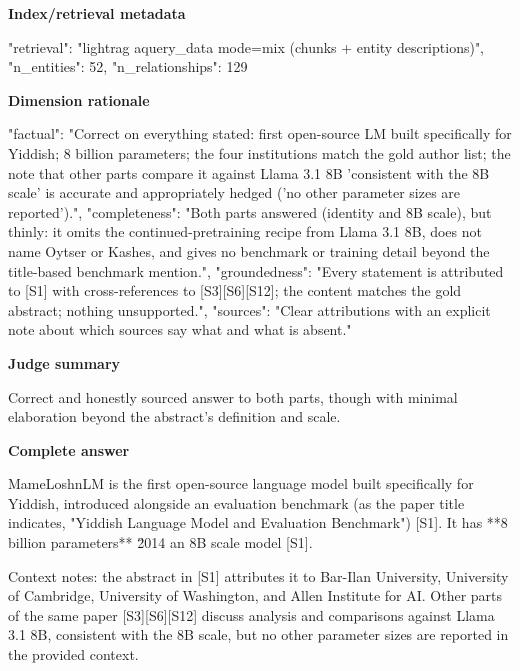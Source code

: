 \documentclass[10pt]{article}
\begin{document}
\textbf{Index/retrieval metadata}
\begin{EvidenceText}
{
  "retrieval": "lightrag aquery_data mode=mix (chunks + entity descriptions)",
  "n_entities": 52,
  "n_relationships": 129
}
\end{EvidenceText}

\textbf{Dimension rationale}
\begin{EvidenceText}
{
  "factual": "Correct on everything stated: first open-source LM built specifically for Yiddish; 8 billion parameters; the four institutions match the gold author list; the note that other parts compare it against Llama 3.1 8B 'consistent with the 8B scale' is accurate and appropriately hedged ('no other parameter sizes are reported').",
  "completeness": "Both parts answered (identity and 8B scale), but thinly: it omits the continued-pretraining recipe from Llama 3.1 8B, does not name Oytser or Kashes, and gives no benchmark or training detail beyond the title-based benchmark mention.",
  "groundedness": "Every statement is attributed to [S1] with cross-references to [S3][S6][S12]; the content matches the gold abstract; nothing unsupported.",
  "sources": "Clear attributions with an explicit note about which sources say what and what is absent."
}
\end{EvidenceText}

\textbf{Judge summary}
\begin{EvidenceText}
Correct and honestly sourced answer to both parts, though with minimal elaboration beyond the abstract's definition and scale.
\end{EvidenceText}

\textbf{Complete answer}
\begin{AnswerText}
MameLoshnLM is the first open-source language model built specifically for Yiddish, introduced alongside an evaluation benchmark (as the paper title indicates, "Yiddish Language Model and Evaluation Benchmark") [S1]. It has **8 billion parameters** \u2014 an 8B scale model [S1].

Context notes: the abstract in [S1] attributes it to Bar-Ilan University, University of Cambridge, University of Washington, and Allen Institute for AI. Other parts of the same paper [S3][S6][S12] discuss analysis and comparisons against Llama 3.1 8B, consistent with the 8B scale, but no other parameter sizes are reported in the provided context.
\end{AnswerText}
\end{document}
